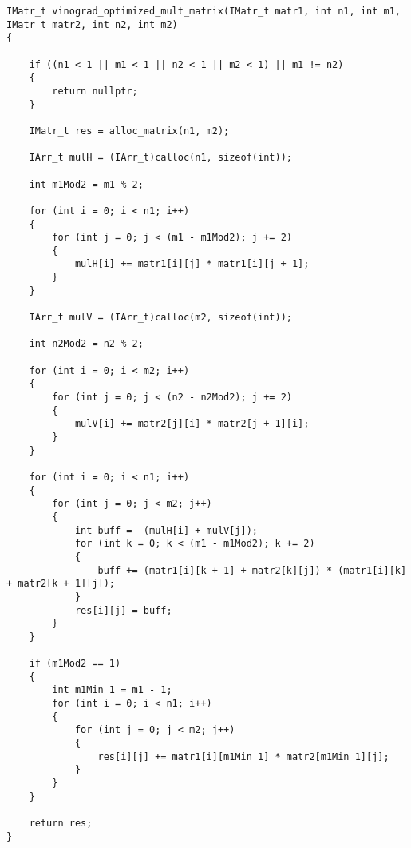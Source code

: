 \documentclass[utf8x, 12pt]{G7-32}
\begin{document}
\begin{lstlisting}[label=num_3,caption=Оптимизированный алгоритм Винограда, escapechar=@]
IMatr_t vinograd_optimized_mult_matrix(IMatr_t matr1, int n1, int m1, IMatr_t matr2, int n2, int m2)
{

    if ((n1 < 1 || m1 < 1 || n2 < 1 || m2 < 1) || m1 != n2)
    {
        return nullptr;
    }

    IMatr_t res = alloc_matrix(n1, m2);

    IArr_t mulH = (IArr_t)calloc(n1, sizeof(int));

    int m1Mod2 = m1 % 2;

    for (int i = 0; i < n1; i++)
    {
        for (int j = 0; j < (m1 - m1Mod2); j += 2)
        {
            mulH[i] += matr1[i][j] * matr1[i][j + 1];
        }
    }

    IArr_t mulV = (IArr_t)calloc(m2, sizeof(int));

    int n2Mod2 = n2 % 2;

    for (int i = 0; i < m2; i++)
    {
        for (int j = 0; j < (n2 - n2Mod2); j += 2)
        {
            mulV[i] += matr2[j][i] * matr2[j + 1][i];
        }
    }

    for (int i = 0; i < n1; i++)
    {
        for (int j = 0; j < m2; j++)
        {
            int buff = -(mulH[i] + mulV[j]);
            for (int k = 0; k < (m1 - m1Mod2); k += 2)
            {
                buff += (matr1[i][k + 1] + matr2[k][j]) * (matr1[i][k] + matr2[k + 1][j]);
            }
            res[i][j] = buff;
        }
    }

    if (m1Mod2 == 1)
    {
        int m1Min_1 = m1 - 1;
        for (int i = 0; i < n1; i++)
        {
            for (int j = 0; j < m2; j++)
            {
                res[i][j] += matr1[i][m1Min_1] * matr2[m1Min_1][j];
            }
        }
    }

    return res;
}
\end{lstlisting}
\end{document}
